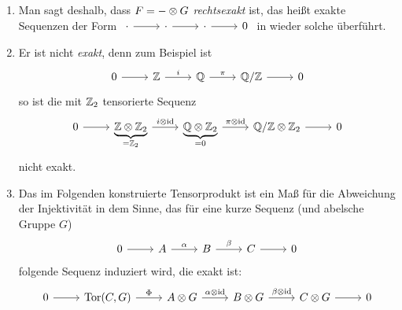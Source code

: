 \begin{kommentar}
  \begin{enumerate}
    \item
      Man sagt deshalb, dass $F = - \otimes G$ \emph{rechtsexakt} ist, das heißt exakte Sequenzen der Form $
      \begin{tikzcd}
      \cdot \arrow{r}{}
      & \cdot \arrow{r}{}
      & \cdot \arrow{r}{}
      & 0
      \end{tikzcd}
      $
      in wieder solche überführt.
    \item
      Er ist nicht \emph{exakt}, denn zum Beispiel ist
      \begin{equation*}
        \begin{tikzcd}
          0 \arrow{r}{}
          & \Z \arrow{r}{i}
          & \Q \arrow{r}{\pi}
          & \Q /\Z \arrow{r}{}
          & 0
        \end{tikzcd}
      \end{equation*}
      so ist die mit $\mathbb{Z}_2$ tensorierte Sequenz
      \begin{equation*}
        \begin{tikzcd}
          0 \arrow{r}{}
          & \underbrace{\Z \tensor \Z_2}_{=\Z_2} \arrow{r}{i \tensor \id}
          & \underbrace{\Q \tensor \Z_2}_{=0} \arrow{r}{\pi \tensor \id}
          & \Q /\Z \tensor \Z_2 \arrow{r}{}
          & 0
        \end{tikzcd}
      \end{equation*}
      nicht exakt.
    \item
      Das im Folgenden konstruierte Tensorprodukt ist ein Maß für die Abweichung der Injektivität in dem Sinne, das für eine kurze Sequenz (und abelsche Gruppe $G$)
      \begin{equation*}
        \begin{tikzcd}
          0 \arrow{r}{}
          & A \arrow{r}{\alpha}
          & B \arrow{r}{\beta}
          & C \arrow{r}{}
          & 0
        \end{tikzcd}
      \end{equation*}
      folgende Sequenz induziert wird, die exakt ist:
      \begin{equation*}
        \begin{tikzcd}
          0 \arrow{r}{}
          & \Tor(C,G) \arrow{r}{\Phi}
          & A \tensor G \arrow{r}{\alpha \tensor \id}
          & B \tensor G \arrow{r}{\beta \tensor \id}
          & C \tensor G \arrow{r}{}
          & 0
        \end{tikzcd}
      \end{equation*}
  \end{enumerate}
\end{kommentar}

